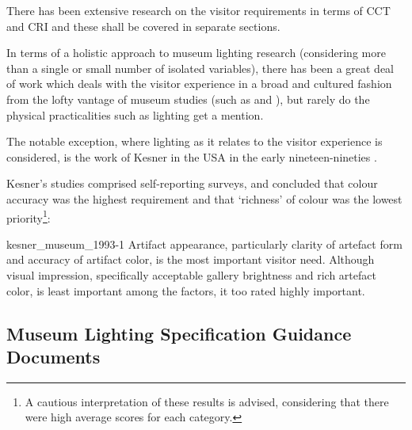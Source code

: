 There has been extensive research on the visitor requirements in terms of \gls{CCT} and \gls{CRI} and these shall be covered in separate sections.

In terms of a holistic approach to museum lighting research (considering more than a single or small number of isolated variables), there has been a great deal of work which deals with the visitor experience in a broad and cultured fashion from the lofty vantage of museum studies (such as \citet{falk_museum_2016} and \citet{shapiro_museum_1990}), but rarely do the physical practicalities such as lighting get a mention. 

The notable exception, where lighting as it relates to the visitor experience is considered, is the work of Kesner in the USA in the early nineteen-nineties \citep{kesner_museum_1993-1,kesner_museum_1993,kesner_exhibition_1992,kesner_current_1991,kesner_analysis_1997}.

Kesner's studies comprised self-reporting surveys, and concluded that colour accuracy was the highest requirement and that `richness' of colour was the lowest priority\footnote{A cautious interpretation of these results is advised, considering that there were high average scores for each category.}:

\begin{citequote}{kesner_museum_1993-1}
Artifact appearance, particularly clarity of artefact form and accuracy of artifact color, is the most important visitor need. Although visual impression, specifically acceptable gallery brightness and rich artefact color, is least important among the factors, it too rated highly important.
\end{citequote}



\subsection{Museum Lighting Specification Guidance Documents}

